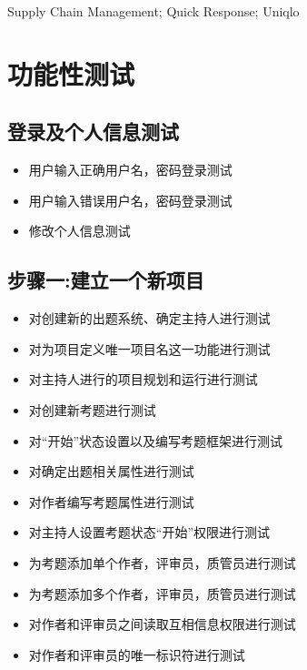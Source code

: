 \documentclass[hyperref, a4paper]{ctexart}
\providecommand{\tightlist}{%
  \setlength{\itemsep}{0pt}\setlength{\parskip}{0pt}}
\begin{document}
Supply Chain Management; Quick Response; Uniqlo

\normalsize

\newpage

\tableofcontents

\newpage

\hypertarget{ux529fux80fdux6027ux6d4bux8bd5}{%
\section{功能性测试}\label{ux529fux80fdux6027ux6d4bux8bd5}}

\hypertarget{ux767bux5f55ux53caux4e2aux4ebaux4fe1ux606fux6d4bux8bd5}{%
\subsection{登录及个人信息测试}\label{ux767bux5f55ux53caux4e2aux4ebaux4fe1ux606fux6d4bux8bd5}}

\begin{itemize}
\tightlist
\item
  用户输入正确用户名，密码登录测试
\item
  用户输入错误用户名，密码登录测试
\item
  修改个人信息测试
\end{itemize}

\hypertarget{ux6b65ux9aa4ux4e00ux5efaux7acbux4e00ux4e2aux65b0ux9879ux76ee}{%
\subsection{步骤一:建立一个新项目}\label{ux6b65ux9aa4ux4e00ux5efaux7acbux4e00ux4e2aux65b0ux9879ux76ee}}

\begin{itemize}
\tightlist
\item
  对创建新的出题系统、确定主持人进行测试
\item
  对为项目定义唯一项目名这一功能进行测试
\item
  对主持人进行的项目规划和运行进行测试
\item
  对创建新考题进行测试
\item
  对``开始''状态设置以及编写考题框架进行测试
\item
  对确定出题相关属性进行测试
\item
  对作者编写考题属性进行测试
\item
  对主持人设置考题状态``开始''权限进行测试
\item
  为考题添加单个作者，评审员，质管员进行测试
\item
  为考题添加多个作者，评审员，质管员进行测试
\item
  对作者和评审员之间读取互相信息权限进行测试
\item
  对作者和评审员的唯一标识符进行测试
\end{itemize}
\end{document}
